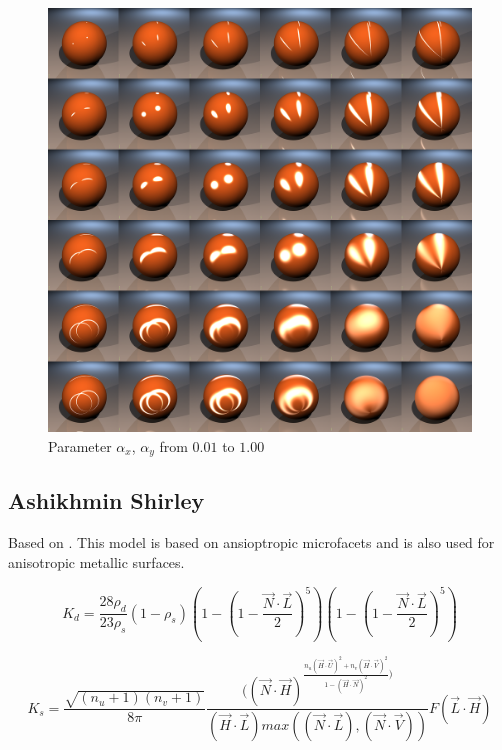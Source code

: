 \documentclass[11pt,a4paper]{article}
\begin{document}
\begin{figure}[H]
\centering

\includegraphics[scale=0.25]{warduvcomplete.png}
\caption{Parameter $\alpha_x$, $\alpha_y$ from $0.01$ to $1.00$}
\end{figure}

\newpage
\subsection{Ashikhmin Shirley}
Based on \cite{AS00}. This model is based on ansioptropic microfacets and is also used for anisotropic metallic surfaces.

\begin{equation}
K_d = \frac{28 \rho_d}{23 \rho_s} (1 - \rho_s)\left(1-\left(1- \frac{\vec{N} \cdot \vec{L}}{2}\right)^5\right)\left(1-\left(1-\frac{\vec{N} \cdot \vec{L}}{2}\right)^5\right)
\end{equation}

\begin{equation}
K_s = \frac{\sqrt{(n_u+1)(n_v+1)}}{8\pi} \frac{((\vec{N} \cdot \vec{H})^{ \frac{n_u(\vec{H} \cdot \vec{U})^2 + n_v(\vec{H} \cdot \vec{V})^2}{1-(\vec{H} \cdot \vec{N})^2})}}{(\vec{H} \cdot \vec{L}) max((\vec{N} \cdot \vec{L}),(\vec{N} \cdot \vec{V}))} F(\vec{L} \cdot \vec{H})
\end{equation}
\end{document}

